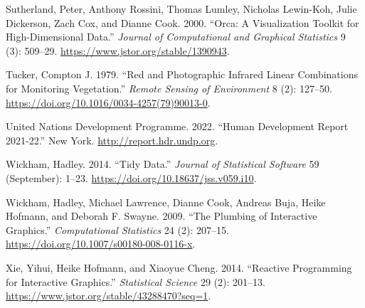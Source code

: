 \documentclass[
]{article}
\newlength{\cslhangindent}
\newlength{\cslentryspacingunit} %
\newenvironment{CSLReferences}[2] %
 {%
  \setlength{\parindent}{0pt}
  \ifodd #1
  \let\oldpar\par
  \def\par{\hangindent=\cslhangindent\oldpar}
  \fi
  \setlength{\parskip}{#2\cslentryspacingunit}
 }%
 {}
\begin{document}
\begin{CSLReferences}{1}{0}
\leavevmode{}%
Sutherland, Peter, Anthony Rossini, Thomas Lumley, Nicholas Lewin-Koh,
Julie Dickerson, Zach Cox, and Dianne Cook. 2000. {``Orca: {A}
{Visualization} {Toolkit} for {High}-{Dimensional} {Data}.''}
\emph{Journal of Computational and Graphical Statistics} 9 (3): 509--29.
\url{https://www.jstor.org/stable/1390943}.

\leavevmode{}%
Tucker, Compton J. 1979. {``Red and Photographic Infrared Linear
Combinations for Monitoring Vegetation.''} \emph{Remote Sensing of
Environment} 8 (2): 127--50.
\url{https://doi.org/10.1016/0034-4257(79)90013-0}.

\leavevmode{}%
United Nations Development Programme. 2022. {``Human Development Report
2021-22.''} New York. \url{http://report.hdr.undp.org}.

\leavevmode{}%
Wickham, Hadley. 2014. {``Tidy {Data}.''} \emph{Journal of Statistical
Software} 59 (September): 1--23.
\url{https://doi.org/10.18637/jss.v059.i10}.

\leavevmode{}%
Wickham, Hadley, Michael Lawrence, Dianne Cook, Andreas Buja, Heike
Hofmann, and Deborah F. Swayne. 2009. {``The Plumbing of Interactive
Graphics.''} \emph{Computational Statistics} 24 (2): 207--15.
\url{https://doi.org/10.1007/s00180-008-0116-x}.

\leavevmode{}%
Xie, Yihui, Heike Hofmann, and Xiaoyue Cheng. 2014. {``Reactive
{Programming} for {Interactive} {Graphics}.''} \emph{Statistical
Science} 29 (2): 201--13.
\url{https://www.jstor.org/stable/43288470?seq=1}.

\end{CSLReferences}
\end{document}
